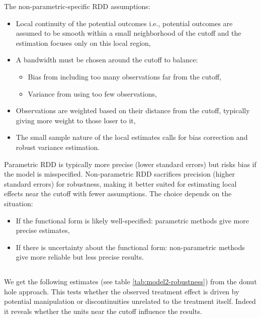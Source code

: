 \documentclass{article}
\begin{document}
The non-parametric-specific RDD assumptions:
\begin{itemize}
    \item Local continuity of the potential outcomes i.e., potential outcomes are assumed to be smooth within a small neighborhood of the cutoff and the estimation focuses only on this local region,
    \item A bandwidth must be chosen around the cutoff to balance:
    \begin{itemize}
        \item Bias from including too many observations far from the cutoff,
        \item Variance from using too few observations,
    \end{itemize}
    \item Observations are weighted based on their distance from the cutoff, typically giving more weight to those loser to it,
    \item The small sample nature of the local estimates calls for bias correction and robust variance estimation.
\end{itemize}

Parametric RDD is typically more precise (lower standard errors) but risks bias if the model is misspecified.
Non-parametric RDD sacrifices precision (higher standard errors) for robustness, making it better suited for estimating local effects near the cutoff with fewer assumptions. The choice depends on the situation:
\begin{itemize}
    \item If the functional form is likely well-specified: parametric methods give more precise estimates,
    \item If there is uncertainty about the functional form: non-parametric methods give more reliable but less precise results.
\end{itemize}


\subsection{}

We get the following estimates (see table \ref{tab:model2-robustness}) from the donut hole approach. This tests whether the observed treatment effect is driven by potential manipulation or discontinuities unrelated to the treatment itself. Indeed it reveals whether the units near the cutoff influence the results.
\end{document}
